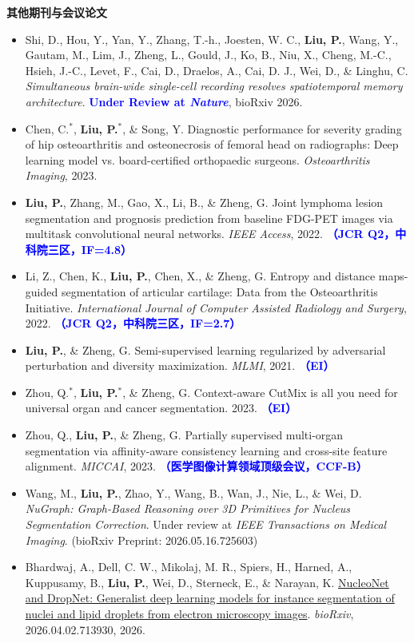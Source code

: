 {\large\bfseries\sffamily 其他期刊与会议论文\par}
\begin{itemize}
\item Shi, D., Hou, Y., Yan, Y., Zhang, T.-h., Joesten, W. C., \textbf{Liu, P.}, Wang, Y., Gautam, M., Lim, J., Zheng, L., Gould, J., Ko, B., Niu, X., Cheng, M.-C., Hsieh, J.-C., Levet, F., Cai, D., Draelos, A., Cai, D. J., Wei, D., \& Linghu, C. \textit{Simultaneous brain-wide single-cell recording resolves spatiotemporal memory architecture}. \textcolor{blue}{\textbf{Under Review at \textit{Nature}}}, bioRxiv 2026.
\item Chen, C.$^*$, \textbf{Liu, P.}$^*$, \& Song, Y. Diagnostic performance for severity grading of hip osteoarthritis and osteonecrosis of femoral head on radiographs: Deep learning model vs. board-certified orthopaedic surgeons. \textit{Osteoarthritis Imaging}, 2023.
\item \textbf{Liu, P.}, Zhang, M., Gao, X., Li, B., \& Zheng, G. Joint lymphoma lesion segmentation and prognosis prediction from baseline FDG-PET images via multitask convolutional neural networks. \textit{IEEE Access}, 2022. \textcolor{blue}{\textbf{（JCR Q2，中科院三区，IF=4.8）}}
\item Li, Z., Chen, K., \textbf{Liu, P.}, Chen, X., \& Zheng, G. Entropy and distance maps-guided segmentation of articular cartilage: Data from the Osteoarthritis Initiative. \textit{International Journal of Computer Assisted Radiology and Surgery}, 2022. \textcolor{blue}{\textbf{（JCR Q2，中科院三区，IF=2.7）}}
\item \textbf{Liu, P.}, \& Zheng, G. Semi-supervised learning regularized by adversarial perturbation and diversity maximization. \textit{MLMI}, 2021. \textcolor{blue}{\textbf{（EI）}}
\item Zhou, Q.$^*$, \textbf{Liu, P.}$^*$, \& Zheng, G. Context-aware CutMix is all you need for universal organ and cancer segmentation. 2023. \textcolor{blue}{\textbf{（EI）}}
\item Zhou, Q., \textbf{Liu, P.}, \& Zheng, G. Partially supervised multi-organ segmentation via affinity-aware consistency learning and cross-site feature alignment. \textit{MICCAI}, 2023. \textcolor{blue}{\textbf{（医学图像计算领域顶级会议，CCF-B）}}
\item Wang, M., \textbf{Liu, P.}, Zhao, Y., Wang, B., Wan, J., Nie, L., \& Wei, D. \textit{NuGraph: Graph-Based Reasoning over 3D Primitives for Nucleus Segmentation Correction}. Under review at \textit{IEEE Transactions on Medical Imaging}. (bioRxiv Preprint: 2026.05.16.725603)
\item Bhardwaj, A., Dell, C. W., Mikolaj, M. R., Spiers, H., Harned, A., Kuppusamy, B., \textbf{Liu, P.}, Wei, D., Sterneck, E., \& Narayan, K. \href{https://doi.org/10.64898/2026.04.02.713930}{NucleoNet and DropNet: Generalist deep learning models for instance segmentation of nuclei and lipid droplets from electron microscopy images}. \textit{bioRxiv}, 2026.04.02.713930, 2026.
\end{itemize}

